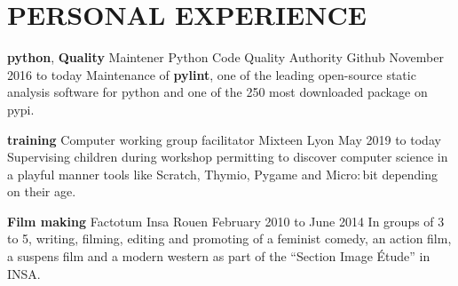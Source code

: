 \documentclass[11pt,a4paper]{moderncv}
\begin{document}


  \section{PERSONAL EXPERIENCE}

    \cventry
    {\textbf{python}, \textbf{Quality}}
    {Maintener}
    {Python Code Quality Authority}
    {Github}
    {November 2016  to today}{
      Maintenance of \textbf{pylint}, one of the leading open-source static analysis software for python
      and one of the 250 most downloaded package on pypi.
    }

    \cventry
    {\textbf{training}}
    {Computer working group facilitator}
    {Mixteen}
    {Lyon}
    {May 2019 to today}{
	  Supervising children during workshop permitting to discover computer science in a
	  playful manner tools like Scratch, Thymio, Pygame and Micro$:$bit depending on their age.
    }




    \cventry
    {\textbf{Film making}}
    {Factotum}
    {Insa}
    {Rouen}
    {February 2010 to June 2014}{
      In groups of 3 to 5, writing, filming, editing and promoting of a
      feminist comedy, an action film, a suspens film and a modern western as
      part of the ``Section Image Étude'' in INSA.
    }

\end{document}
